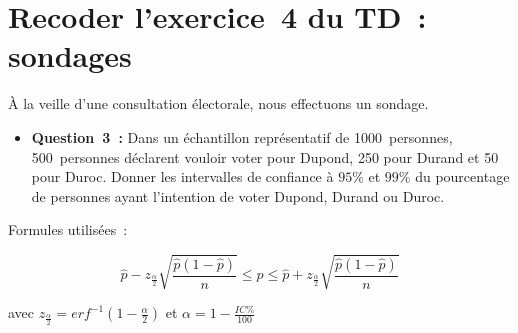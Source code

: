 \clearpage

\section{Recoder l’exercice~4 du TD~: sondages}
\vspace{.2cm}

\noindent
À la veille d’une consultation électorale, nous effectuons un sondage. 


\begin{itemize}[label={},itemindent=-2em,leftmargin=2em]
    \item \textbf{Question~3~:} Dans un échantillon représentatif de 1000~personnes, 500~personnes déclarent vouloir
    voter pour Dupond, 250 pour Durand et 50 pour Duroc. Donner les intervalles de confiance à $95\%$
    et $99\%$ du pourcentage de personnes ayant l’intention de voter Dupond, Durand ou Duroc.
\end{itemize}
\vspace{.2cm}


\noindent
Formules utilisées~:

\begin{equation}
    \hat{p} - z_{\frac{\alpha}{2}} \sqrt{\frac{\hat{p}(1-\hat{p})}{n}} \leq p \leq \hat{p} + z_{\frac{\alpha}{2}} \sqrt{\frac{\hat{p}(1-\hat{p})}{n}}
    \label{eq:ic_grand2}
\end{equation}

\begin{center}
    avec \qquad $z_{\frac{\alpha}{2}}=erf^{-1}(1 - \frac{\alpha}{2})$ \qquad et \qquad $\alpha = 1- \frac{IC\%}{100}$
\end{center}

\vspace{.2cm}

